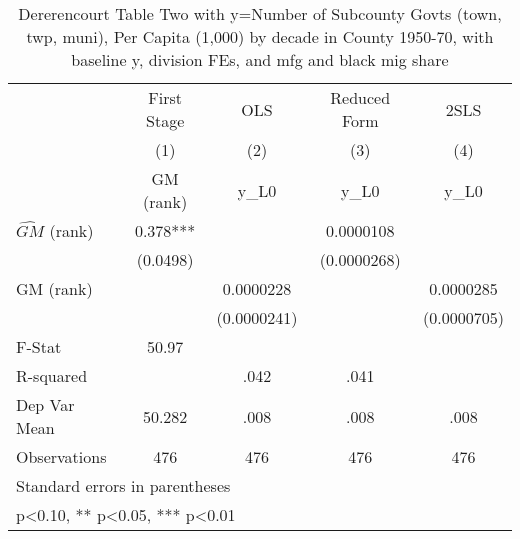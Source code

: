 \begin{table}[htbp]\centering
\def\sym#1{\ifmmode^{#1}\else\(^{#1}\)\fi}
\caption{Dererencourt Table Two with y=Number of Subcounty Govts (town, twp, muni), Per Capita (1,000) by decade in County 1950-70, with baseline y, division FEs, and mfg and black mig share}
\begin{tabular}{l*{4}{c}}
\toprule
                    & First Stage   &         OLS   &Reduced Form   &        2SLS   \\
                    &\multicolumn{1}{c}{(1)}&\multicolumn{1}{c}{(2)}&\multicolumn{1}{c}{(3)}&\multicolumn{1}{c}{(4)}\\
                    &\multicolumn{1}{c}{GM  (rank)}&\multicolumn{1}{c}{y\_L0}&\multicolumn{1}{c}{y\_L0}&\multicolumn{1}{c}{y\_L0}\\
\midrule
$\hat{GM}$ (rank)   &       0.378***&               &   0.0000108   &               \\
                    &    (0.0498)   &               & (0.0000268)   &               \\
\addlinespace
GM  (rank)          &               &   0.0000228   &               &   0.0000285   \\
                    &               & (0.0000241)   &               & (0.0000705)   \\
\midrule
F-Stat              &       50.97   &               &               &               \\
R-squared           &               &        .042   &        .041   &               \\
Dep Var Mean        &      50.282   &        .008   &        .008   &        .008   \\
Observations        &         476   &         476   &         476   &         476   \\
\bottomrule
\multicolumn{5}{l}{\footnotesize Standard errors in parentheses}\\
\multicolumn{5}{l}{\footnotesize * p<0.10, ** p<0.05, *** p<0.01}\\
\end{tabular}
\end{table}
